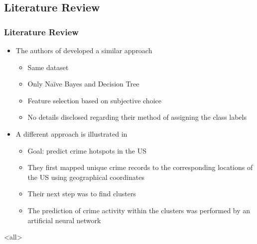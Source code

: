 \mode*
\begin{frame}
  \section{Literature Review}
  \frametitle{Literature Review}
  \onslide<+->
  \begin{itemize}
    \item<+-> The authors of \cite{indian} developed a similar approach
      \begin{itemize}
        \item<+-> Same dataset
        \item<+-> Only Na\"ive Bayes and Decision Tree
        \item<+-> Feature selection based on subjective choice
        \item<+-> No details disclosed regarding their method of assigning the
          class labels
      \end{itemize}
    \item<+-> A different approach is illustrated in \cite{forecast}
      \begin{itemize}
        \item<+-> Goal: predict crime hotspots in the US
        \item<+-> They first mapped unique crime records to the
          corresponding locations of the US using geographical coordinates
        \item<+-> Their next step was to find clusters
        \item<+-> The prediction of crime activity within the clusters was
          performed by an artificial neural network
      \end{itemize}
  \end{itemize}
\end{frame}

\mode<all>
